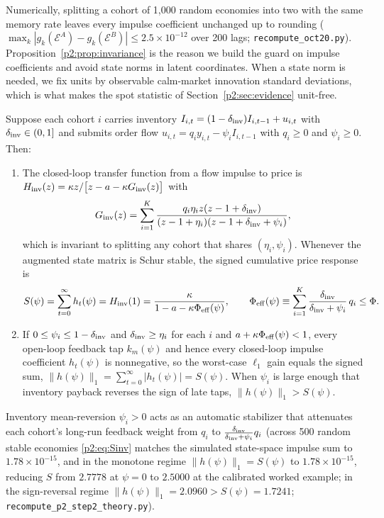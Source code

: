 Numerically, splitting a cohort of 1{,}000 random economies into two with the same memory rate leaves every impulse coefficient unchanged up to rounding ($\max_k|g_k(\mathcal E^A)-g_k(\mathcal E^B)|\le2.5\times10^{-12}$ over 200 lags; \texttt{recompute\_oct20.py}). Proposition~\ref{p2:prop:invariance} is the reason we build the guard on impulse coefficients and avoid state norms in latent coordinates. When a state norm is needed, we fix units by observable calm-market innovation standard deviations, which is what makes the spot statistic of Section~\ref{p2:sec:evidence} unit-free.
\begin{proposition}\label{p2:prop:inventory_S}
Suppose each cohort $i$ carries inventory $I_{i,t}=(1-\delta_{\rm inv})I_{i,t-1}+u_{i,t}$ with $\delta_{\rm inv}\in(0,1]$ and submits order flow $u_{i,t}=q_i y_{i,t}-\psi_i I_{i,t-1}$ with $q_i\ge0$ and $\psi_i\ge0$. Then:
\begin{enumerate}[label=(\roman*)]
\item The closed-loop transfer function from a flow impulse to price is $H_{\rm inv}(z)=\kappa z/\bigl[z-a-\kappa G_{\rm inv}(z)\bigr]$ with
\[
G_{\rm inv}(z)=\sum_{i=1}^K \frac{q_i\eta_i z(z-1+\delta_{\rm inv})}{(z-1+\eta_i)(z-1+\delta_{\rm inv}+\psi_i)},
\]
which is invariant to splitting any cohort that shares $(\eta_i,\psi_i)$. Whenever the augmented state matrix is Schur stable, the signed cumulative price response is
\begin{equation}\label{p2:eq:Sinv}
S(\psi)=\sum_{t=0}^\infty h_t(\psi)=H_{\rm inv}(1)=\frac{\kappa}{1-a-\kappa\Phi_{\rm eff}(\psi)},\qquad \Phi_{\rm eff}(\psi)\equiv\sum_{i=1}^K\frac{\delta_{\rm inv}}{\delta_{\rm inv}+\psi_i}\,q_i\le\Phi.
\end{equation}
\item If $0\le\psi_i\le 1-\delta_{\rm inv}$ and $\delta_{\rm inv}\ge\eta_i$ for each $i$ and $a+\kappa\Phi_{\rm eff}(\psi)<1$, every open-loop feedback tap $k_m(\psi)$ and hence every closed-loop impulse coefficient $h_t(\psi)$ is nonnegative, so the worst-case $\ell_1$ gain equals the signed sum, $\|h(\psi)\|_1=\sum_{t=0}^\infty |h_t(\psi)|=S(\psi)$. When $\psi_i$ is large enough that inventory payback reverses the sign of late taps, $\|h(\psi)\|_1>S(\psi)$.
\end{enumerate}
\end{proposition}

Inventory mean-reversion $\psi_i>0$ acts as an automatic stabilizer that attenuates each cohort's long-run feedback weight from $q_i$ to $\frac{\delta_{\rm inv}}{\delta_{\rm inv}+\psi_i}q_i$ (across 500 random stable economies \eqref{p2:eq:Sinv} matches the simulated state-space impulse sum to $1.78\times10^{-15}$, and in the monotone regime $\|h(\psi)\|_1=S(\psi)$ to $1.78\times10^{-15}$, reducing $S$ from $2.7778$ at $\psi=0$ to $2.5000$ at the calibrated worked example; in the sign-reversal regime $\|h(\psi)\|_1=2.0960>S(\psi)=1.7241$; \texttt{recompute\_p2\_step2\_theory.py}).

